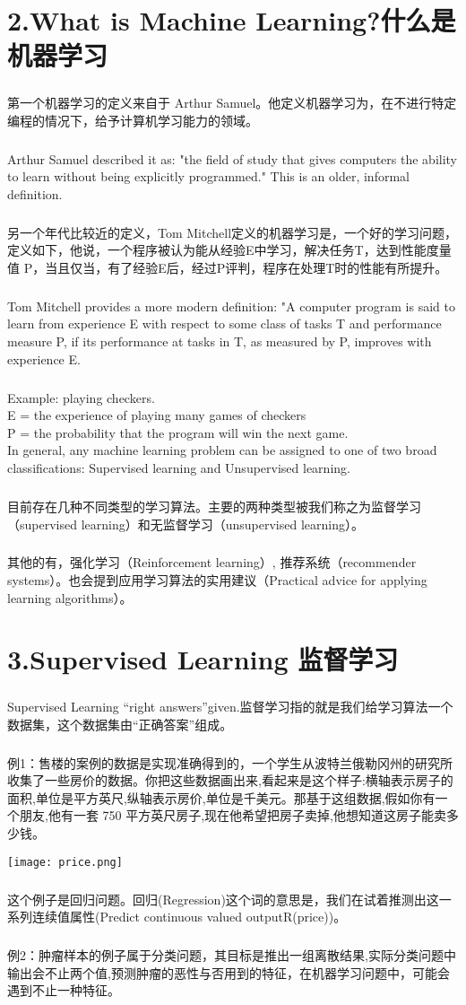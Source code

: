 \documentclass{article}
\begin{document}
\begin{CJK}{UTF8}{gbsn}
\section*{2.What is Machine Learning?什么是机器学习}
\subparagraph*{}
第一个机器学习的定义来自于 Arthur Samuel。他定义机器学习为，在不进行特定编程的情况下，给予计算机学习能力的领域。
\subparagraph*{}
 Arthur Samuel described it as: "the field of study that gives computers the ability to learn without being explicitly programmed." This is an older, informal definition.
\subparagraph*{}
另一个年代比较近的定义，Tom Mitchell定义的机器学习是，一个好的学习问题，定义如下，他说，一个程序被认为能从经验E中学习，解决任务T，达到性能度量值 P，当且仅当，有了经验E后，经过P评判，程序在处理T时的性能有所提升。
\subparagraph*{}
Tom Mitchell provides a more modern definition: "A computer program is said to learn from experience E with respect to some class of tasks T and performance measure P, if its performance at tasks in T, as measured by P, improves with experience E.
\subparagraph*{}
Example: playing checkers.\\
E = the experience of playing many games of checkers\\
P = the probability that the program will win the next game.\\
In general, any machine learning problem can be assigned to one of two broad classifications:
Supervised learning and Unsupervised learning.\\
\subparagraph*{}
目前存在几种不同类型的学习算法。主要的两种类型被我们称之为监督学习（supervised learning）和无监督学习（unsupervised learning）。
\subparagraph*{}
其他的有，强化学习（Reinforcement learning）, 推荐系统（recommender systems）。也会提到应用学习算法的实用建议（Practical advice for applying learning algorithms）。
\section*{3.Supervised Learning 监督学习}
\subparagraph*{}
Supervised Learning ``right answers''given.监督学习指的就是我们给学习算法一个数据集，这个数据集由“正确答案”组成。
\subparagraph*{}
例1：售楼的案例的数据是实现准确得到的，一个学生从波特兰俄勒冈州的研究所收集了一些房价的数据。你把这些数据画出来,看起来是这个样子:横轴表示房子的面积,单位是平方英尺,纵轴表示房价,单位是千美元。那基于这组数据,假如你有一个朋友,他有一套 750 平方英尺房子,现在他希望把房子卖掉,他想知道这房子能卖多少钱。

\texttt{[image: price.png]}
\subparagraph*{}
这个例子是回归问题。回归(Regression)这个词的意思是，我们在试着推测出这一系列连续值属性(Predict continuous valued outputR(price))。
\subparagraph*{}
例2：肿瘤样本的例子属于分类问题，其目标是推出一组离散结果,实际分类问题中输出会不止两个值,预测肿瘤的恶性与否用到的特征，在机器学习问题中，可能会遇到不止一种特征。


\end{CJK}
\end{document}
